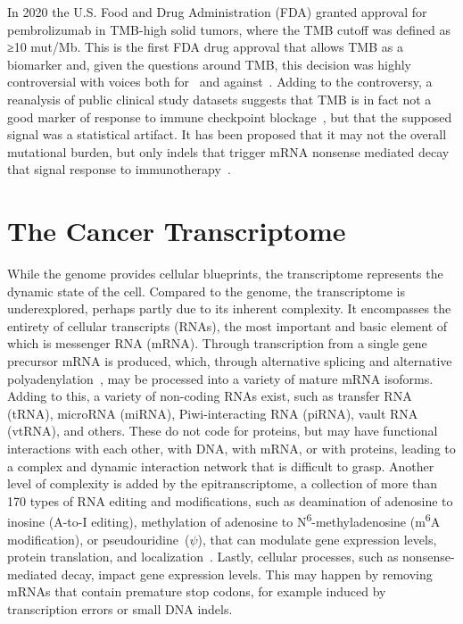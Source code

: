 \documentclass[11pt]{book}
\begin{document}
In 2020 the U.S. Food and Drug Administration (FDA) granted approval for pembrolizumab in TMB-high solid tumors, where the TMB cutoff was defined as ≥10 mut/Mb. This is the first FDA drug approval that allows TMB as a biomarker and, given the questions around TMB, this decision was highly controversial with voices both for~\cite{Subbiah:2020} and against~\cite{PrasadAddeo:2020}. Adding to the controversy, a reanalysis of public clinical study datasets suggests that TMB is in fact not a good marker of response to immune checkpoint blockage~\cite{Gurjao:2020}, but that the supposed signal was a statistical artifact. It has been proposed that it may not the overall mutational burden, but only indels that trigger mRNA nonsense mediated decay that signal response to immunotherapy~\cite{Lindeboom:2019, Litchfield:2020}.


%
%
\section{The Cancer Transcriptome}

While the genome provides cellular blueprints, the transcriptome represents the dynamic state of the cell. Compared to the genome, the transcriptome is underexplored, perhaps partly due to its inherent complexity. It encompasses the entirety of cellular transcripts (RNAs), the most important and basic element of which is messenger RNA (mRNA). Through transcription from a single gene precursor mRNA is produced, which, through alternative splicing and alternative polyadenylation~\cite{DiGiammartino:2011, Xue:2018}, may be processed into a variety of mature mRNA isoforms. Adding to this, a variety of non-coding RNAs exist, such as transfer RNA (tRNA), microRNA (miRNA), Piwi-interacting RNA (piRNA), vault RNA (vtRNA), and others. These do not code for proteins, but may have functional interactions with each other, with DNA, with mRNA, or with proteins, leading to a complex and dynamic interaction network that is difficult to grasp. Another level of complexity is added by the epitranscriptome, a collection of more than 170 types of RNA editing and modifications, such as deamination of adenosine to inosine (A-to-I editing), methylation of adenosine to N\textsuperscript{6}-methyladenosine (m\textsuperscript{6}A modification), or pseudouridine~($\psi$), that can modulate gene expression levels, protein translation, and localization~\cite{ZhaoHe:2015, Davalos:2018, BooKim:2020, WienerSchwartz:2020}. Lastly, cellular processes, such as nonsense-mediated decay, impact gene expression levels. This may happen by removing mRNAs that contain premature stop codons, for example induced by transcription errors or small DNA indels. 
\end{document}
